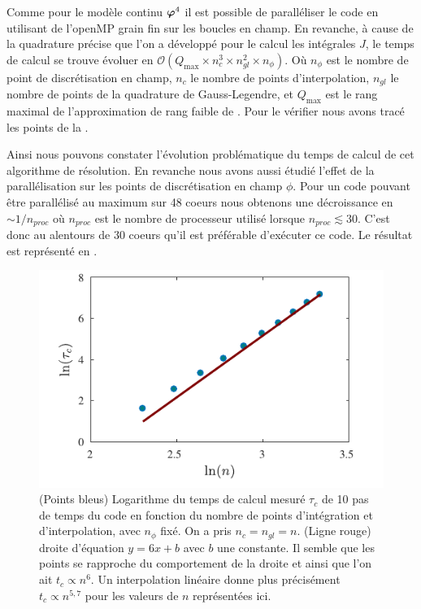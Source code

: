 \documentclass[10.5pt]{article}
\begin{document}
\begin{multicols}{2}
Comme pour le modèle continu $\boldsymbol{ \varphi}^4$ il est possible de paralléliser le code en utilisant de l'openMP \cite{openmp2002c++} grain fin sur les boucles en champ. En revanche, à cause de la quadrature précise que l'on a développé pour le calcul les intégrales $J$, le temps de calcul se trouve évoluer en $\mathcal{O}( Q_\text{max} \times n_c^3 \times n_{gl}^2 \times n_{\phi})$. Où $n_{\phi}$ est le nombre de point de discrétisation en champ, $n_c$ le nombre de points d'interpolation, $n_{{gl}}$ le nombre de points de la quadrature de Gauss-Legendre, et $Q_{\text{max}}$ est le rang maximal de l'approximation de rang faible de . Pour le vérifier nous avons tracé les points de la .


Ainsi nous pouvons constater l'évolution problématique du temps de calcul de cet algorithme de résolution. En revanche nous avons aussi étudié l'effet de la parallélisation sur les points de discrétisation en champ $\phi$. Pour un code pouvant être parallélisé au maximum sur 48 coeurs nous obtenons une décroissance en $\sim 1/n_{proc}$ où $n_{proc}$ est le nombre de processeur utilisé lorsque $n_{proc} \lesssim 30$. C'est donc au alentours de $30$ coeurs qu'il est préférable d'exécuter ce code. Le résultat est représenté en  .


\begin{figure}[H]
\begin{center}
	\includegraphics[width=0.95\columnwidth]{ComplexiteTemps.pdf}
\end{center}
\caption{(Points bleus) Logarithme du temps de calcul mesuré $\tau_c$ de 10 pas de temps du code en fonction du nombre de points d'intégration et d'interpolation, avec $n_\phi$ fixé. On a pris $n_c = n_{gl} = n$. (Ligne rouge) droite d'équation $y=6x+b$ avec $b$ une constante. Il semble que les points se rapproche du comportement de la droite et ainsi que l'on ait $t_c \propto n^6$. Un interpolation linéaire donne plus précisément $t_c \propto n^{5,7}$ pour les valeurs de $n$ représentées ici.}
\label{fig:timeNc}
\end{figure}




\end{multicols}
\end{document}
